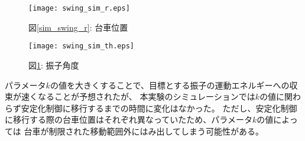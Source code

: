 \begin{figure}[htbp]
    \begin{minipage}{0.5\hsize}
        \begin{center}
            \texttt{[image: swing\_sim\_r.eps]}
            \caption{図\ref{sim_swing_r}: 台車位置}
            \label{sim_swing_r}
        \end{center}
    \end{minipage}
    \begin{minipage}{0.5\hsize}
        \begin{center}
            \texttt{[image: swing\_sim\_th.eps]}
            \caption{図\ref{sim_swing_th}: 振子角度}
            \label{sim_swing_th}
        \end{center}
    \end{minipage}
\end{figure}

パラメータ$k$の値を大きくすることで、目標とする振子の運動エネルギーへの収束が速くなることが予想されたが、
本実験のシミュレーションでは$k$の値に関わらず安定化制御に移行するまでの時間に変化はなかった。
ただし、安定化制御に移行する際の台車位置はそれぞれ異なっていたため、パラメータ$k$の値によっては
台車が制限された移動範囲外にはみ出してしまう可能性がある。


